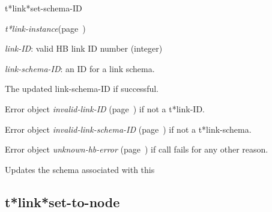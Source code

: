 \begin{description}
\item [Name:]  t*link*set-schema-ID

\item [Class:] {\sl t*link-instance}\hfill(page~\pageref{t*link-instance})

\item [Parameters:]
\item {\sl link-ID}:  
valid HB link ID number (integer)

\item {\sl link-schema-ID}:  an ID for a link schema.


\item [Return-value:]
The updated link-schema-ID if successful.

Error object {\sl invalid-link-ID} (page~\pageref{invalid-link-ID}) if not a t*link-ID.

Error object {\sl invalid-link-schema-ID} (page~\pageref{invalid-link-schema-ID}) if not
a t*link-schema.

Error object {\sl unknown-hb-error} (page~\pageref{unknown-hb-error}) if call fails
for any other reason.

\item [Description:]

Updates the schema associated with this 

\item [Public:]

























\end{description}
\horizontalline

\subsection{t*link*set-to-node}
\label{t*link*set-to-node}

